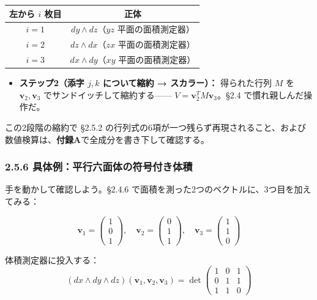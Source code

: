 \documentclass[a4paper,12pt,openany]{book}
\providecommand{\tightlist}{%
  \setlength{\itemsep}{0pt}\setlength{\parskip}{0pt}}
\begin{document}
\begin{longtable}[]{@{}cc@{}}
\toprule\noalign{}
左から \(i\) 枚目 & 正体 \\
\midrule\noalign{}
\endhead
\bottomrule\noalign{}
\endlastfoot
\(i=1\) & \(dy \wedge dz\)（\(yz\) 平面の面積測定器） \\
\(i=2\) & \(dz \wedge dx\)（\(zx\) 平面の面積測定器） \\
\(i=3\) & \(dx \wedge dy\)（\(xy\) 平面の面積測定器） \\
\end{longtable}

\begin{itemize}
\tightlist
\item
  \textbf{ステップ2（添字 $j,k$ について縮約 → スカラー）：}
  得られた行列 \(M\) を \(\mathbf{v}_2, \mathbf{v}_3\)
  でサンドイッチして縮約する——
  \(V = \mathbf{v}_2^T M \mathbf{v}_3\)。§2.4 で慣れ親しんだ操作だ。
\end{itemize}

この2段階の縮約で §2.5.2
の行列式の6項が一つ残らず再現されること、および数値検算は、\textbf{付録A}で全成分を書き下して確認する。

\hypertarget{ux5177ux4f53ux4f8bux5e73ux884cux516dux9762ux4f53ux306eux7b26ux53f7ux4ed8ux304dux4f53ux7a4d}{%
\subsubsection{2.5.6
具体例：平行六面体の符号付き体積}\label{ux5177ux4f53ux4f8bux5e73ux884cux516dux9762ux4f53ux306eux7b26ux53f7ux4ed8ux304dux4f53ux7a4d}}

手を動かして確認しよう。§2.4.6
で面積を測った2つのベクトルに、3つ目を加えてみる：

\[\mathbf{v}_1 = \begin{pmatrix}1\\0\\1\end{pmatrix}, \quad \mathbf{v}_2 = \begin{pmatrix}0\\1\\1\end{pmatrix}, \quad \mathbf{v}_3 = \begin{pmatrix}1\\1\\0\end{pmatrix}\]

体積測定器に投入する：
\[(dx \wedge dy \wedge dz)(\mathbf{v}_1, \mathbf{v}_2, \mathbf{v}_3) = \det\begin{pmatrix}1 & 0 & 1 \\ 0 & 1 & 1 \\ 1 & 1 & 0\end{pmatrix}\]
\end{document}
